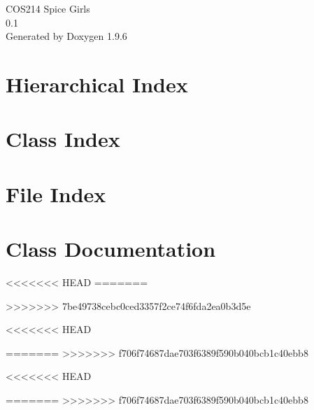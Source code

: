 \documentclass[twoside]{book}
\newcommand{\+}{\discretionary{\mbox{\scriptsize$\hookleftarrow$}}{}{}}
\newcommand{\clearemptydoublepage}{%
    \newpage{\pagestyle{empty}\cleardoublepage}%
  }
\begin{document}
  \raggedbottom
    \hypersetup{pageanchor=false,
                bookmarksnumbered=true,
                pdfencoding=unicode
               }
  \begin{titlepage}
  \vspace*{7cm}
  \begin{center}%
  {\Large COS214 Spice Girls}\\
  [1ex]\large 0.\+1 \\
  \vspace*{1cm}
  {\large Generated by Doxygen 1.9.6}\\
  \end{center}
  \end{titlepage}
  \clearemptydoublepage
  \tableofcontents
  \clearemptydoublepage
  \hypersetup{pageanchor=true}
\chapter{Hierarchical Index}

\chapter{Class Index}

\chapter{File Index}

\chapter{Class Documentation}





<<<<<<< HEAD
=======


>>>>>>> 7be49738cebc0ced3357f2ce74f6fda2ea0b3d5e


<<<<<<< HEAD

=======
>>>>>>> f706f74687dae703f6389f590b040bcb1c40ebb8





<<<<<<< HEAD


=======
>>>>>>> f706f74687dae703f6389f590b040bcb1c40ebb8













\end{document}
